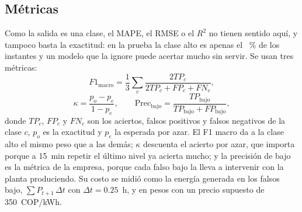\documentclass[conference]{IEEEtran}
\begin{document}
\subsection{M\'etricas}
Como la salida es una clase, el MAPE, el RMSE o el $R^2$ no tienen sentido aqu\'i, y tampoco basta la exactitud: en la prueba la clase alto es apenas el \paltotest{}~\% de los instantes y un modelo que la ignore puede acertar mucho sin servir. Se usan tres m\'etricas:
\begin{equation}
F1_{\text{macro}}=\frac13\sum_{c}\frac{2TP_c}{2TP_c+FP_c+FN_c},
\label{eq:f1}
\end{equation}
\begin{equation}
\kappa=\frac{p_o-p_e}{1-p_e},\qquad
\text{Prec}_{\text{bajo}}=\frac{TP_{\text{bajo}}}{TP_{\text{bajo}}+FP_{\text{bajo}}},
\label{eq:kappa}
\end{equation}
donde $TP_c$, $FP_c$ y $FN_c$ son los aciertos, falsos positivos y falsos negativos de la clase $c$, $p_o$ es la exactitud y $p_e$ la esperada por azar. El F1 macro da a la clase alto el mismo peso que a las dem\'as; $\kappa$ descuenta el acierto por azar, que importa porque a 15~min repetir el \'ultimo nivel ya acierta mucho; y la precisi\'on de bajo es la m\'etrica de la empresa, porque cada falso bajo la lleva a intervenir con la planta produciendo. Su costo se midi\'o como la energ\'ia generada en los falsos bajo, $\sum P_{t+1}\,\Delta t$ con $\Delta t=0.25$~h, y en pesos con un precio supuesto de 350~COP/kWh.
\end{document}
